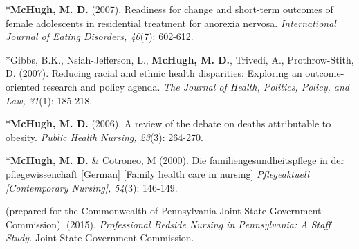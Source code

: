 \documentclass[10pt,]{article}
\begin{document}
{{{{{{{{{{{{{{{\begin{hangparas}{.25in}{1}
\end{hangparas}



\begin{hangparas}{.25in}{1}

*{\textbf {McHugh, M. D.}} (2007). Readiness for change and short-term outcomes of female adolescents in residential treatment for anorexia nervosa. {\textit {International Journal of Eating Disorders, 40}}(7): 602-612.

\end{hangparas}



\begin{hangparas}{.25in}{1}

*Gibbs, B.K., Nsiah-Jefferson, L., {\textbf {McHugh, M. D.}}, Trivedi, A., Prothrow-Stith, D. (2007). Reducing racial and ethnic health disparities: Exploring an outcome-oriented research and policy agenda. {\textit {The Journal of Health, Politics, Policy, and Law, 31}}(1): 185-218.

\end{hangparas}



\begin{hangparas}{.25in}{1}

*{\textbf {McHugh, M. D.}} (2006). A review of the debate on deaths attributable to obesity. {\textit {Public Health Nursing, 23}}(3): 264-270.

\end{hangparas}



\begin{hangparas}{.25in}{1}

*{\textbf {McHugh, M. D.}} \& Cotroneo, M (2000). Die familiengesundheitspflege in der pflegewissenchaft  [German] [Family health care in nursing] {\textit {Pflegeaktuell [Contemporary Nursing], 54}}(3): 146-149.

\end{hangparas}

\vspace{4mm}


\begin{hangparas}{.25in}{1}

 (prepared for the Commonwealth of Pennsylvania Joint State Government Commission). (2015). {\textit {Professional Bedside Nursing in Pennsylvania: A Staff Study.}} Joint State Government Commission.


\end{hangparas}}}}}}}}}}}}}}}}
\end{document}
